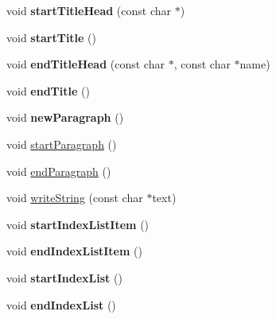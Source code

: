\begin{DoxyCompactItemize}
\item 
\hypertarget{class_latex_generator_a3f80d51c2cd9ad266f0dc628d4c349da}{void {\bfseries start\-Title\-Head} (const char $\ast$)}\label{class_latex_generator_a3f80d51c2cd9ad266f0dc628d4c349da}

\item 
\hypertarget{class_latex_generator_a1259e131d6695a4bb53ec5e36692840a}{void {\bfseries start\-Title} ()}\label{class_latex_generator_a1259e131d6695a4bb53ec5e36692840a}

\item 
\hypertarget{class_latex_generator_a095d838ffc4c59e810a264f887698285}{void {\bfseries end\-Title\-Head} (const char $\ast$, const char $\ast$name)}\label{class_latex_generator_a095d838ffc4c59e810a264f887698285}

\item 
\hypertarget{class_latex_generator_a7b02cc485cad21197a018533aa05fe79}{void {\bfseries end\-Title} ()}\label{class_latex_generator_a7b02cc485cad21197a018533aa05fe79}

\item 
\hypertarget{class_latex_generator_ab2d43850490bfdac83306b85c7c6265f}{void {\bfseries new\-Paragraph} ()}\label{class_latex_generator_ab2d43850490bfdac83306b85c7c6265f}

\item 
void \hyperlink{class_latex_generator_af7f590b00ecbe6117ddc09f0016df0ec}{start\-Paragraph} ()
\item 
void \hyperlink{class_latex_generator_a3076b52ebe72e4b56c232817cf2a16f0}{end\-Paragraph} ()
\item 
void \hyperlink{class_latex_generator_a02588a2412fdda1d3d31066be2802913}{write\-String} (const char $\ast$text)
\item 
\hypertarget{class_latex_generator_a54bfbe844dbbb52acf519e07a207c2e0}{void {\bfseries start\-Index\-List\-Item} ()}\label{class_latex_generator_a54bfbe844dbbb52acf519e07a207c2e0}

\item 
\hypertarget{class_latex_generator_aec53f232bba59300d9a4fd4b1cf0f753}{void {\bfseries end\-Index\-List\-Item} ()}\label{class_latex_generator_aec53f232bba59300d9a4fd4b1cf0f753}

\item 
\hypertarget{class_latex_generator_a9b31ceb5ba1248cb820bad23a8c6624a}{void {\bfseries start\-Index\-List} ()}\label{class_latex_generator_a9b31ceb5ba1248cb820bad23a8c6624a}

\item 
\hypertarget{class_latex_generator_a38fc8c258fcd3d6196e12c1a51018c9a}{void {\bfseries end\-Index\-List} ()}\label{class_latex_generator_a38fc8c258fcd3d6196e12c1a51018c9a}


\end{DoxyCompactItemize}
